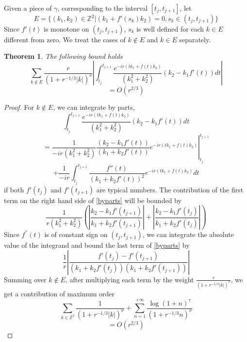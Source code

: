\documentclass[12pt]{amsart}
\numberwithin{equation}{subsection}
\theoremstyle{definition}
\theoremstyle{plain}
\newtheorem{theorem}[equation]{Theorem}
\begin{document}
Given a piece of $\gamma$, corresponding to the interval $[t_j,t_{j+1}]$,
let
\[
E = \{(k_1,k_2) \in \mathbb Z^2 | (k_1 + f'(s_k) k_2) = 0,  s_k \in (t_j,t_{j+1}) \}
\]
Since $f'(t)$ is monotone on $(t_j,t_{j+1})$, $s_k$ is well defined for each $k \in E$ different from zero.
We treat the cases of $k \notin E$ and $k \in E$ separately.

\begin{theorem}
\label{lma}
The following bound holds
\[
\sum_{k \notin E} \frac{r}{(1+r^{-1/3}|k|)^\nu}
\left| \int_{t_j}^{t_{j+1}} \frac{e^{-ir(t k_1 + f(t) k_2)}}{(k_1^2 + k_2^2)}
(k_2  - k_1 f'(t)) dt \right|
\]
\[
= O(r^{2/3})
\]
\end{theorem}

\begin{proof}
For $k \notin E$, we can integrate by parts,
\[
\int_{t_j}^{t_{j+1}} \frac{e^{-ir(t k_1 + f(t) k_2)}}{(k_1^2 + k_2^2)}(k_2 - k_1 f'(t)) dt
\]
\begin{equation}
\label{byparts}
= \left. \frac{1}{-ir(k_1^2 + k_2^2)} \frac{(k_2 - k_1 f'(t))}{(k_1 + k_2 f'(t))} e^{-ir(t k_1 + f(t) k_2)} \right|_{t_j}^{t_{j+1}}
\end{equation}
\[
+ \frac{1}{-ir}\int_{t_j}^{t_{j+1}} \frac{f''(t)}{(k_1 + k_2 f'(t))^2} e^{-ir(t k_1 + f(t) k_2)} dt
\]
if both $f'(t_j)$ and $f'(t_{j+1})$ are typical numbers.
The contribution of the first term on the right hand side of \eqref{byparts} will be bounded by
\begin{equation}
\label{eandnote}
\frac{1}{r(k_1^2 + k_2^2)} \left( \left|  \frac{k_2 - k_1 f'(t_{j+1})}{k_1 + k_2 f'(t_{j+1})} \right| +
\left| \frac{k_2 - k_1 f'(t_{j})}{k_1 + k_2 f'(t_{j})} \right| \right)
\end{equation}
Since $f^{''}(t)$ is of constant sign on $(t_j,t_{j+1})$,
we can integrate the absolute value of the integrand and bound the last term of \eqref{byparts} by
\begin{equation}
\frac{1}{r}
\left| \frac{f'(t_{j})-f'(t_{j+1})}
{(k_1+k_2 f'(t_{j}))(k_1+k_2 f'(t_{j+1}))} \right|
\end{equation}
Summing over $k \notin E$, after multiplying each term by the weight $\frac{r}{(1+r^{-1/3}|k|)^\nu}$, we get a contribution of maximum order
\[
\sum_{k \in \mathbb{Z}^2} \frac{1}{(1+r^{-1/3}|k|)^\nu} + \sum_{n=1}^{+\infty} \frac{\log(1+n)^{\tau}}{(1+r^{-1/3}n)^\nu}
\]
\[
=O(r^{2/3})
\]


\end{proof}
\end{document}
